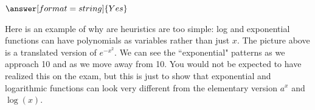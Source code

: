 \documentclass{ximera}
\begin{document}
\begin{question}
$\answer[format=string]{Yes}$

\begin{feedback}
Here is an example of why are heuristics are too simple: log and exponential functions can have polynomials as variables rather than just $x$. The picture above is a translated version of $e^{-x^2}$. We can see the ``exponential" patterns as we approach 10 and as we move away from 10. You would not be expected to have realized this on the exam, but this is just to show that exponential and logarithmic functions can look very different from the elementary version $a^x$ and $\log(x)$.
\end{feedback}

\end{question}
\end{document}
